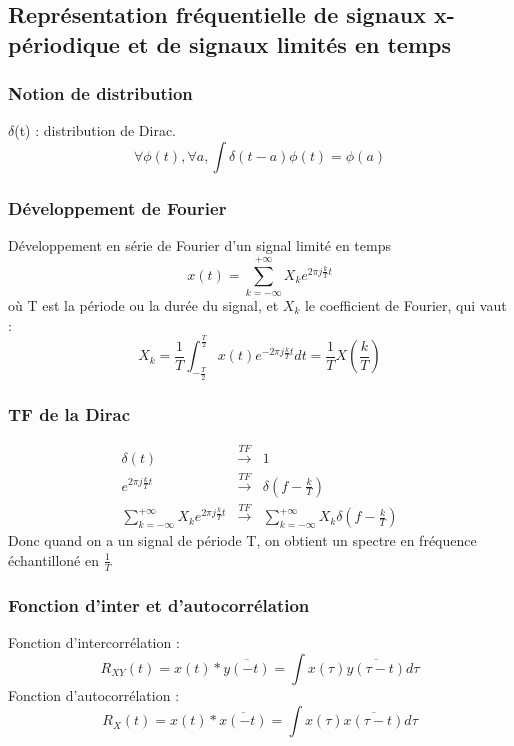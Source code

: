 \subsection{Représentation fréquentielle de signaux x-périodique et de signaux limités en temps}
\subsubsection*{Notion de distribution}
$\delta$(t) : distribution de Dirac. \\
\[\forall \phi(t), \forall a, \int \delta(t-a) \phi(t) = \phi(a)\]

\subsubsection{Développement de Fourier}
Développement en série de Fourier d'un signal limité en temps \[x(t)=\sum_{k=-\infty}^{+\infty} X_k e^{2\pi j \frac{k}{T} t}\]
où T est la période ou la durée du signal, et $X_k$ le coefficient de Fourier, qui vaut :
\[X_k = \frac{1}{T} \int_{-\frac{T}{2}}^{\frac{T}{2}} x(t) e^{-2\pi j \frac{k}{T} t} dt = \frac{1}{T} X\left( \frac{k}{T} \right) \]

\subsubsection{TF de la Dirac}
\begin{eqnarray*}
\delta (t) &\xrightarrow{TF}& 1 \\
e^{2\pi j \frac{k}{T} t} &\xrightarrow{TF}& \delta \left(f-\frac{k}{T} \right) \\
\sum_{k=-\infty}^{+\infty} X_k e^{2\pi j \frac{k}{T} t} &\xrightarrow{TF}& \sum_{k=-\infty}^{+\infty} X_k \delta \left( f-\frac{k}{T} \right)
\end{eqnarray*}
Donc quand on a un signal de période T, on obtient un spectre en fréquence échantilloné en $\frac{1}{T}$

\subsubsection{Fonction d'inter et d'autocorrélation}
Fonction d'intercorrélation : \[R_{XY}(t)=x(t)*\overline{y(-t)} = \int x(\tau)\overline{y(\tau -t)} d\tau\]
Fonction d'autocorrélation : \[R_X (t) = x(t)*\overline{x(-t)}=\int x(\tau)\overline{x(\tau -t)} d\tau\]

